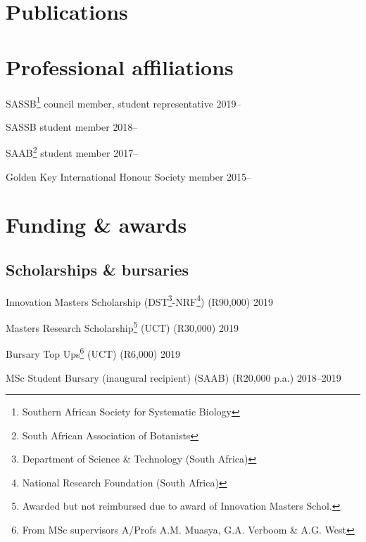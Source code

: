 \documentclass[10pt]{article}
\begin{document}
\section*{Publications} %



\bigskip

\section*{Professional affiliations} %

SASSB\footnote{Southern African Society for Systematic Biology} council member, 
student representative                                    \hfill {\small 2019--}

SASSB student member                                      \hfill {\small 2018--}

SAAB\footnote{South African Association of Botanists} student member
                                                          \hfill {\small 2017--}

Golden Key International Honour Society member            \hfill {\small 2015--}

\section*{Funding \& awards} %

\subsection*{Scholarships \& bursaries}

Innovation Masters Scholarship (DST\footnote{Department of Science \&
Technology (South Africa)}-NRF\footnote{National Research Foundation (South 
Africa)}) (R90,000)                                         \hfill {\small 2019}

Masters Research Scholarship\footnote{Awarded but not reimbursed due to award 
of Innovation Masters Schol.} (UCT) (R30,000)               \hfill {\small 2019}

Bursary Top Ups\footnote{From MSc supervisors A/Profs A.M. Muasya, G.A. Verboom 
\& A.G. West} (UCT) (R6,000)                                \hfill {\small 2019}

MSc Student Bursary (inaugural recipient) (SAAB) (R20,000 p.a.)
                                                      \hfill {\small 2018--2019}
\end{document}
